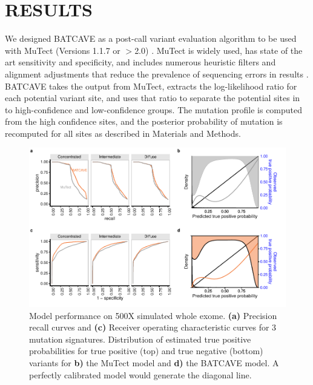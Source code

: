 \documentclass[a4,center,fleqn]{NAR}
\newcommand{\batcave}{BATCAVE }
\begin{document}
\section{RESULTS}
We designed \batcave as a post-call variant evaluation algorithm to be used with MuTect (Versions 1.1.7 or $>$2.0) \cite{Cibulskis2013}.
MuTect is widely used, has state of the art sensitivity and specificity, and includes numerous heuristic filters and alignment adjustments that reduce the prevalence of sequencing errors in results \cite{Griffith2015}.
\batcave takes the output from MuTect, extracts the log-likelihood ratio for each potential variant site, and uses that ratio to separate the potential sites in to high-confidence and low-confidence groups.
The mutation profile is computed from the high confidence sites, and the posterior probability of mutation is recomputed for all sites as described in Materials and Methods.
\begin{figure}
  \begin{center}
  \includegraphics{figures/fig_wes.pdf}
  \end{center}
  \caption{Model performance on 500X simulated whole exome.
  \textbf{(a)} Precision recall curves and \textbf{(c)} Receiver operating characteristic curves for 3 mutation signatures.
  Distribution of estimated true positive probabilities for true positive (top) and true negative (bottom) variants for \textbf{b)} the MuTect model and \textbf{d)} the \batcave model.
  A perfectly calibrated model would generate the diagonal line.}
\label{NAR-wes_fig}
\end{figure}
\end{document}
